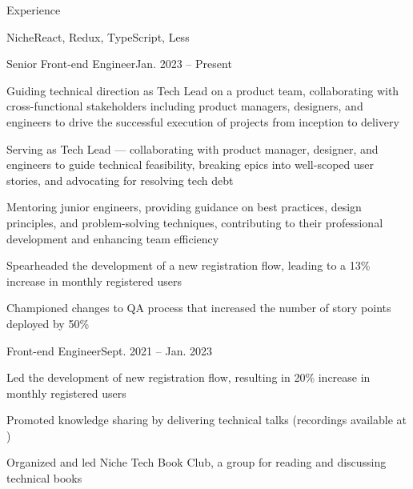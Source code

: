 \documentclass{resume} %
\begin{document}

\begin{rSection}{Experience}
\begin{rCompany}{Niche}{React, Redux, TypeScript, Less}{}{}
\begin{rPromotion}{}{}{Senior Front-end Engineer}{Jan. 2023 – Present}
\item Guiding technical direction as Tech Lead on a product team, collaborating with cross-functional stakeholders including product managers, designers, and engineers to drive the successful execution of projects from inception to delivery
\item Serving as Tech Lead — collaborating with product manager,
designer, and engineers to guide technical feasibility, breaking epics into well-scoped
user stories, and advocating for resolving tech debt
\item Mentoring junior engineers, providing guidance on best practices, design principles, and problem-solving techniques, contributing to their professional development and enhancing team efficiency
\item Spearheaded the development of a new registration flow, leading to a 13\% increase in monthly registered users
\item Championed changes to QA process that increased the number of story points deployed by 50\%
\end{rPromotion}


\begin{rRole}{}{}{Front-end Engineer}{Sept. 2021 – Jan. 2023}
\item Led the development of new registration flow, resulting in 20\% increase in monthly registered users
\item Promoted knowledge sharing by delivering technical talks (recordings available at \href{www.jgs.lol}{})
\item Organized and led Niche Tech Book Club, a group for reading and discussing technical books
\end{rRole}
\end{rCompany}


\end{rSection}
\end{document}
